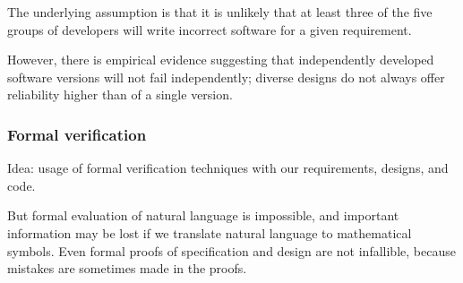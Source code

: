 The underlying assumption is that it is unlikely that at least three of
the five groups of developers will write incorrect software for a given
requirement. \newline

However, there is empirical evidence suggesting that independently
developed software versions will not fail independently; diverse designs
do not always offer reliability higher than of a single version.

\subsubsection{Formal verification}

Idea: usage of formal verification techniques with our requirements,
designs, and code. \newline 

But formal evaluation of natural language is impossible, and important
information may be lost if we translate natural language to mathematical
symbols. Even formal proofs of specification and design are not
infallible, because mistakes are sometimes made in the proofs.
